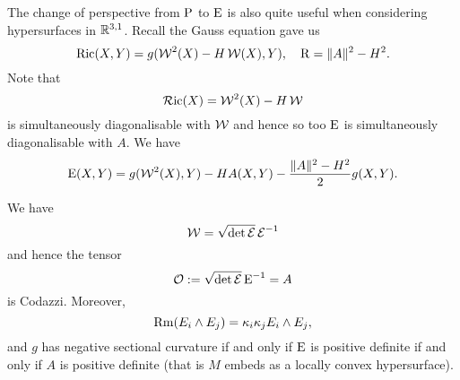 \documentclass[a4paper, 12pt]{amsart}
\begin{document}
The change of perspective from \(\operatorname{P}\) to \(\operatorname{E}\) is also quite useful when considering hypersurfaces in \(\mathbb{R}^{3,1}\). Recall the Gauss equation gave us
\[
\operatorname{Ric}(X, Y) = g(\operatorname{\mathcal{W}}^2(X) - H \operatorname{\mathcal{W}}(X), Y), \quad \operatorname{R} = \|A\|^2 - H^2.
\]
Note that
\[
\operatorname{\mathcal{R}ic} (X) = \operatorname{\mathcal{W}}^2(X) - H \operatorname{\mathcal{W}}
\]
is simultaneously diagonalisable with \(\operatorname{\mathcal{W}}\) and hence so too \(\operatorname{E}\) is simultaneously diagonalisable with \(A\). We have
\begin{equation}
\label{eq:ein_extrinsic}
\operatorname{E} (X, Y) = g(\operatorname{\mathcal{W}}^2(X), Y) - H A(X, Y) - \frac{\|A\|^2 - H^2}{2} g (X, Y).
\end{equation}

\begin{lemma}
\label{lem:ein_W}

We have
\[
\operatorname{\mathcal{W}} = \sqrt{\det \operatorname{\mathcal{E}}} \operatorname{\mathcal{E}}^{-1}
\]
and hence the tensor
\[
\operatorname{\mathcal{O}} := \sqrt{\det \operatorname{\mathcal{E}}} \operatorname{E}^{-1} = A
\]
is Codazzi. Moreover,
\[
\operatorname{Rm} (E_i \wedge E_j) = \kappa_i \kappa_j E_i \wedge E_j,
\]
and \(g\) has negative sectional curvature if and only if \(\operatorname{E}\) is positive definite if and only if \(A\) is positive definite (that is \(M\) embeds as a locally convex hypersurface).
\end{lemma}
\end{document}
